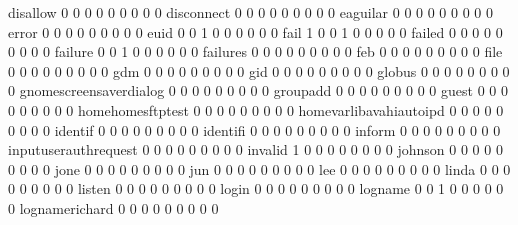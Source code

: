 \documentclass[compress,8pt]{beamer}
\begin{document}
\begin{frame}
\begin{Schunk}
  disallow                                   0   0   0   0   0   0   0   0   0
  disconnect                                 0   0   0   0   0   0   0   0   0
  eaguilar                                   0   0   0   0   0   0   0   0   0
  error                                      0   0   0   0   0   0   0   0   0
  euid                                       0   0   1   0   0   0   0   0   0
  fail                                       1   0   0   1   0   0   0   0   0
  failed                                     0   0   0   0   0   0   0   0   0
  failure                                    0   0   1   0   0   0   0   0   0
  failures                                   0   0   0   0   0   0   0   0   0
  feb                                        0   0   0   0   0   0   0   0   0
  file                                       0   0   0   0   0   0   0   0   0
  gdm                                        0   0   0   0   0   0   0   0   0
  gid                                        0   0   0   0   0   0   0   0   0
  globus                                     0   0   0   0   0   0   0   0   0
  gnomescreensaverdialog                     0   0   0   0   0   0   0   0   0
  groupadd                                   0   0   0   0   0   0   0   0   0
  guest                                      0   0   0   0   0   0   0   0   0
  homehomesftptest                           0   0   0   0   0   0   0   0   0
  homevarlibavahiautoipd                     0   0   0   0   0   0   0   0   0
  identif                                    0   0   0   0   0   0   0   0   0
  identifi                                   0   0   0   0   0   0   0   0   0
  inform                                     0   0   0   0   0   0   0   0   0
  inputuserauthrequest                       0   0   0   0   0   0   0   0   0
  invalid                                    1   0   0   0   0   0   0   0   0
  johnson                                    0   0   0   0   0   0   0   0   0
  jone                                       0   0   0   0   0   0   0   0   0
  jun                                        0   0   0   0   0   0   0   0   0
  lee                                        0   0   0   0   0   0   0   0   0
  linda                                      0   0   0   0   0   0   0   0   0
  listen                                     0   0   0   0   0   0   0   0   0
  login                                      0   0   0   0   0   0   0   0   0
  logname                                    0   0   1   0   0   0   0   0   0
  lognamerichard                             0   0   0   0   0   0   0   0   0

\end{Schunk}
\end{frame}
\end{document}
